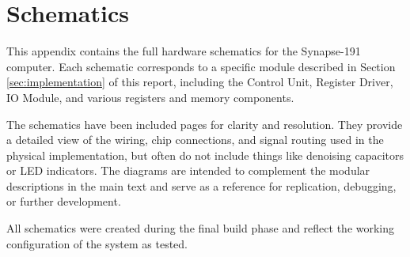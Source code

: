 \section{Schematics} \label{sec:appendix:schematics}

This appendix contains the full hardware schematics for the Synapse-191 computer. Each schematic corresponds to a specific module described in Section \ref{sec:implementation} of this report, including the Control Unit, Register Driver, IO Module, and various registers and memory components.

The schematics have been included  pages for clarity and resolution. They provide a detailed view of the wiring, chip connections, and signal routing used in the physical implementation, but often do not include things like denoising capacitors or LED indicators. The diagrams are intended to complement the modular descriptions in the main text and serve as a reference for replication, debugging, or further development.

All schematics were created during the final build phase and reflect the working configuration of the system as tested.














